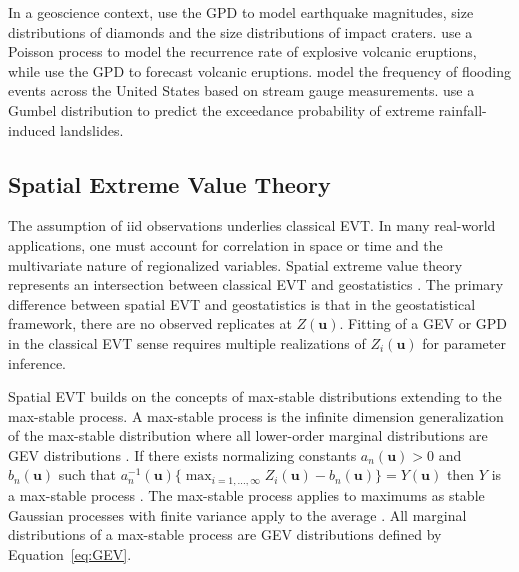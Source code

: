 In a geoscience context, \cite{caers1999statistics,caers1999statisticsa} use the \gls{GPD} to model earthquake magnitudes, size distributions of diamonds and the size distributions of impact craters. \cite{deligne2010recurrence} use a Poisson process to model the recurrence rate of explosive volcanic eruptions, while \cite{nguyen2023dynamic} use the \gls{GPD} to forecast volcanic eruptions. \cite{miniussi2020metastatistical} model the frequency of flooding events across the United States based on stream gauge measurements. \cite{lee2021temporal} use a Gumbel distribution to predict the exceedance probability of extreme rainfall-induced landslides.

\FloatBarrier
\subsection{Spatial Extreme Value Theory}
\label{subsec:01spevt}

The assumption of \acrfull{iid} observations underlies classical \gls{EVT}. In many real-world applications, one must account for correlation in space or time and the multivariate nature of regionalized variables. Spatial extreme value theory represents an intersection between classical \gls{EVT} and geostatistics \citep{neves2015geostatistical}. The primary difference between spatial \gls{EVT} and geostatistics is that in the geostatistical framework, there are no observed replicates at $Z(\mathbf{u})$. Fitting of a \gls{GEV} or \gls{GPD} in the classical \gls{EVT} sense requires multiple realizations of $Z_i(\mathbf{u})$ for parameter inference.

Spatial \gls{EVT} builds on the concepts of max-stable distributions extending to the max-stable process. A max-stable process is the infinite dimension generalization of the max-stable distribution where all lower-order marginal distributions are \gls{GEV} distributions \citep{schlather2003dependence}. If there exists normalizing constants $a_n(\mathbf{u}) > 0$ and $b_n(\mathbf{u})$ such that $a_n^{-1}(\mathbf{u})\{\max_{i=1,...,\infty} Z_i(\mathbf{u}) - b_n(\mathbf{u})\} = Y(\mathbf{u})$ then $Y$ is a max-stable process \citep{dehaan2007extreme}. The max-stable process applies to maximums as stable Gaussian processes with finite variance apply to the average \citep{chiles2012geostatistics}. All marginal distributions of a max-stable process are \gls{GEV} distributions defined by Equation~\ref{eq:GEV}.

